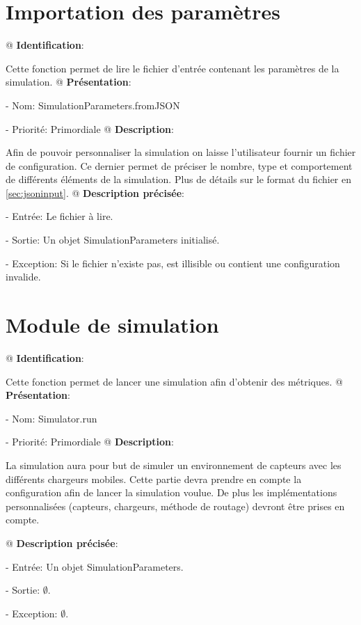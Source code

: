 \documentclass[final]{polytech/polytech}
\begin{document}
	\section{Importation des paramètres}
		\begin{easylist}[enumerate]
			@ \textbf{Identification}:
			
			Cette fonction permet de lire le fichier d'entrée contenant les paramètres de la simulation.
			@ \textbf{Présentation}:
			
			- Nom: SimulationParameters.fromJSON
			
			- Priorité: Primordiale
			@ \textbf{Description}:
			
			Afin de pouvoir personnaliser la simulation on laisse l'utilisateur fournir un fichier de configuration.
			Ce dernier permet de préciser le nombre, type et comportement de différents éléments de la simulation.
			Plus de détails sur le format du fichier en \autoref{sec:jsoninput}.
			@ \textbf{Description précisée}:
			
			- Entrée: Le fichier à lire.
			
			- Sortie: Un objet SimulationParameters initialisé.
			
			- Exception: Si le fichier n'existe pas, est illisible ou contient une configuration invalide.
		\end{easylist}
		
	\section{Module de simulation}
		\begin{easylist}[enumerate]
			@ \textbf{Identification}:
			
			Cette fonction permet de lancer une simulation afin d'obtenir des métriques.
			@ \textbf{Présentation}:
			
			- Nom: Simulator.run
			
			- Priorité: Primordiale
			@ \textbf{Description}:
			
			La simulation aura pour but de simuler un environnement de capteurs avec les différents chargeurs mobiles.
			Cette partie devra prendre en compte la configuration afin de lancer la simulation voulue.
			De plus les implémentations personnalisées (capteurs, chargeurs, méthode de routage) devront être prises en compte.
			
			@ \textbf{Description précisée}:
			
			- Entrée: Un objet SimulationParameters.
			
			- Sortie: $\emptyset$.
			
			- Exception: $\emptyset$.
		\end{easylist}
\end{document}
